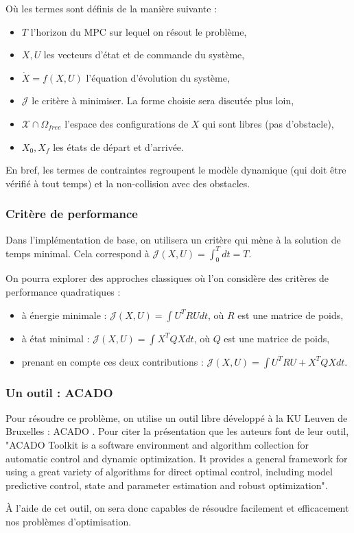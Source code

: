 \documentclass[a4paper,12pt]{report}
\newcommand{\bi}{\begin{itemize}}
\newcommand{\ei}{\end{itemize}}
\newcommand{\itemo}{\item[\textsf{o}]}
\begin{document}
Où les termes sont définis de la manière suivante :
\bi
\itemsep1em
\itemo $T$ l'horizon du MPC sur lequel on résout le problème,
\itemo $X, U$ les vecteurs d'état et de commande du système,
\itemo $\dot X = f(X,U)$ l'équation d'évolution du système,
\itemo $\mathcal{J}$ le critère à minimiser. La forme choisie sera discutée plus loin,
\itemo $\mathcal{X} \cap \Omega_{free}$ l'espace des configurations de $X$ qui sont libres (pas d'obstacle),
\itemo $X_0, X_f$ les états de départ et d'arrivée.
\ei

\vspace*{0.5cm}
En bref, les termes de contraintes regroupent le modèle dynamique (qui doit être vérifié à tout temps) et la non-collision avec des obstacles.


\subsubsection{Critère de performance}
Dans l'implémentation de base, on utilisera un critère qui mène à la solution de temps minimal. Cela correspond à $\mathcal{J}(X,U) = \displaystyle \int_{0}^{T} dt = T$. 

On pourra explorer des approches classiques où l'on considère des critères de performance quadratiques :
\vspace{1em}
\bi
\item à énergie minimale : $\mathcal{J}(X,U) = \displaystyle \int U^T R U dt$, où $R$ est une matrice de poids,
\item à état minimal : $\mathcal{J}(X,U) = \displaystyle \int X^T Q X dt$, où $Q$ est une matrice de poids,
\item prenant en compte ces deux contributions : $\mathcal{J}(X,U) = \displaystyle \int U^T R U + X^T Q X dt$.
\ei


\subsubsection{Un outil : ACADO}
Pour résoudre ce problème, on utilise un outil libre développé à la KU Leuven de Bruxelles : ACADO \cite{acado}. Pour citer la présentation que les auteurs font de leur outil, "ACADO Toolkit is a software environment and algorithm collection for automatic control and dynamic optimization. It provides a general framework for using a great variety of algorithms for direct optimal control, including model predictive control, state and parameter estimation and robust optimization". 

À l'aide de cet outil, on sera donc capables de résoudre facilement et efficacement nos problèmes d'optimisation.
\end{document}

